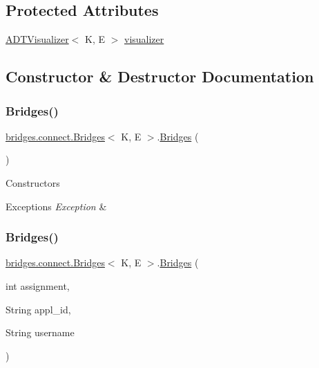 \subsection*{Protected Attributes}
\begin{DoxyCompactItemize}
\item 
\hyperlink{classbridges_1_1base_1_1_a_d_t_visualizer}{A\+D\+T\+Visualizer}$<$ K, E $>$ \hyperlink{classbridges_1_1connect_1_1_bridges_af3fc35779b31c976ed8bf2e173310502}{visualizer}
\end{DoxyCompactItemize}


\subsection{Constructor \& Destructor Documentation}
\hypertarget{classbridges_1_1connect_1_1_bridges_a4925cf146eff9ff84e89351ab574795d}{}\label{classbridges_1_1connect_1_1_bridges_a4925cf146eff9ff84e89351ab574795d} 
\subsubsection{\texorpdfstring{Bridges()}{Bridges()}\hspace{0.1cm}{\footnotesize\ttfamily [1/2]}}
{\footnotesize\ttfamily \hyperlink{classbridges_1_1connect_1_1_bridges}{bridges.\+connect.\+Bridges}$<$ K, E $>$.\hyperlink{classbridges_1_1connect_1_1_bridges}{Bridges} (\begin{DoxyParamCaption}{ }\end{DoxyParamCaption})}

Constructors 
\begin{DoxyExceptions}{Exceptions}
{\em Exception} & \\
\hline
\end{DoxyExceptions}
\hypertarget{classbridges_1_1connect_1_1_bridges_a297e7ca95c725fa20bce0768c2d9aa64}{}\label{classbridges_1_1connect_1_1_bridges_a297e7ca95c725fa20bce0768c2d9aa64} 
\subsubsection{\texorpdfstring{Bridges()}{Bridges()}\hspace{0.1cm}{\footnotesize\ttfamily [2/2]}}
{\footnotesize\ttfamily \hyperlink{classbridges_1_1connect_1_1_bridges}{bridges.\+connect.\+Bridges}$<$ K, E $>$.\hyperlink{classbridges_1_1connect_1_1_bridges}{Bridges} (\begin{DoxyParamCaption}\item[{int}]{assignment,  }\item[{String}]{appl\+\_\+id,  }\item[{String}]{username }\end{DoxyParamCaption})}



